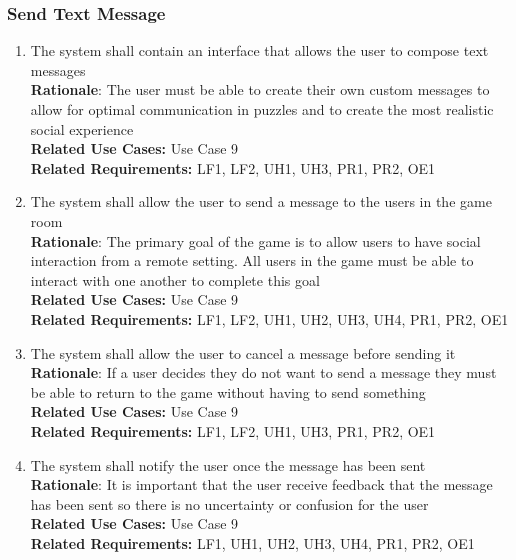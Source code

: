 \documentclass[12pt]{article}
\begin{document}
\subsubsection{Send Text Message}
    \begin{enumerate}[label=SM\arabic*., series=SendMessage]
        \item The system shall contain an interface that allows the user to compose text messages\\
        \textbf{Rationale}: The user must be able to create their own custom messages to allow for optimal communication in puzzles and to create the most realistic social experience\\
        \textbf{Related Use Cases:} Use Case 9\\
        \textbf{Related Requirements:} LF1, LF2, UH1, UH3, PR1, PR2, OE1
        \item The system shall allow the user to send a message to the users in the game room\\
        \textbf{Rationale}: The primary goal of the game is to allow users to have social interaction from a remote setting. All users in the game must be able to interact with one another to complete this goal\\
        \textbf{Related Use Cases:} Use Case 9\\
        \textbf{Related Requirements:} LF1, LF2, UH1, UH2, UH3, UH4, PR1, PR2, OE1
        \item The system shall allow the user to cancel a message before sending it\\
        \textbf{Rationale}: If a user decides they do not want to send a message they must be able to return to the game without having to send something\\
        \textbf{Related Use Cases:} Use Case 9\\
        \textbf{Related Requirements:} LF1, LF2, UH1, UH3, PR1, PR2, OE1
        \item The system shall notify the user once the message has been sent\\
        \textbf{Rationale}: It is important that the user receive feedback that the message has been sent so there is no uncertainty or confusion for the user\\
        \textbf{Related Use Cases:} Use Case 9\\
        \textbf{Related Requirements:} LF1, UH1, UH2, UH3, UH4, PR1, PR2, OE1
    \end{enumerate}
\end{document}
